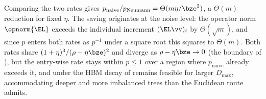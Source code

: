 \begin{remark}\label{rem:E-compare}
Comparing the two rates gives
$p_{\mathrm{naive}}/p_{\mathrm{Neumann}}=\Theta(m\eta/\bze^2)$, a $\Theta(m)$
reduction for fixed $\eta$. The saving originates at the noise level: the operator
norm $\opnorm{\EL}$ exceeds the individual increment $(\EL\vv)_i$ by
$\Theta(\sqrt m)$, and since $p$ enters both rates as $p^{-1}$ under a square root
this squares to $\Theta(m)$. Both rates share $(1+\eta)^3/(\rho-\eta\bze)^2$ and
diverge as $\rho-\eta\bze\to0$ (the boundary of ), but the
entry-wise rate stays within $p\le1$ over a region where $p_{\mathrm{naive}}$
already exceeds it, and under the HBM decay of  remains feasible
for larger $D_{\max}$, accommodating deeper and more imbalanced trees than the
Euclidean route admits.
\end{remark}
